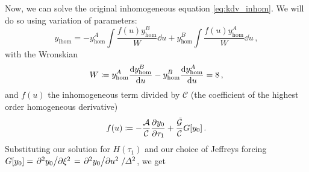 \documentclass{jfm}
\begin{document}
Now, we can solve the original inhomogeneous equation
\cref{eq:kdv_inhom}.
We will do so using variation of parameters:
\begin{equation}
  y_{\text{ihom}} =
  -y^A_{\text{hom}} \int \frac{f(u) y^B_{\text{hom}}}{W} \dd{u}
  +y^B_{\text{hom}} \int \frac{f(u) y^A_{\text{hom}}}{W} \dd{u} \,,
\end{equation}
with the Wronskian
\begin{equation}
  W \coloneqq
    y^A_{\text{hom}} \dv{y^B_{\text{hom}}}{u}
    -y^B_{\text{hom}} \dv{y^A_{\text{hom}}}{u}
    = 8 \,,
\end{equation}
and $f(u)$ the inhomogeneous term divided by $\mathcal{C}$ (the
coefficient of the highest order homogeneous derivative)
\begin{equation}
  f(u) \coloneqq -\frac{\mathcal{A}}{\mathcal{C}} \pdv{y_0}{\tau_1}
    + \frac{\mathcal{\tilde{G}}}{\mathcal{C}} G[y_0] \,.
\end{equation}
Substituting our solution for $H(\tau_1)$ and our choice of Jeffreys
forcing $G[y_0] = \pdv*[2]{y_0}{\xi} = \pdv*[2]{y_0}{u}/\varDelta^2$, we
get
\end{document}

